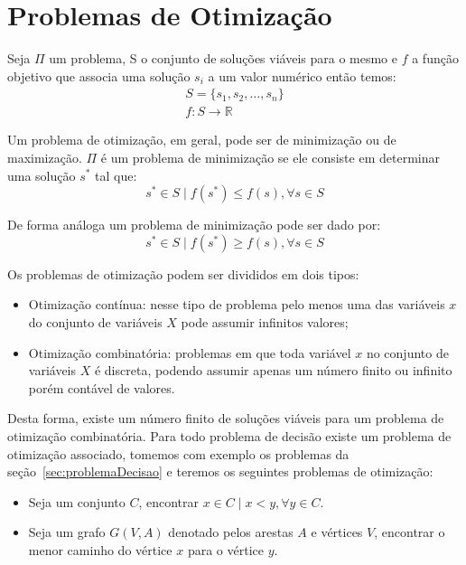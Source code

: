 \section{Problemas de Otimização} \label{sec:problemaOtimizacao}

Seja $\Pi$ um problema, S o conjunto de soluções viáveis para o mesmo e $f$ a função objetivo que associa uma solução $s_i$ a um valor numérico então temos:
\begin{equation}  \label{eq:problemaOtimizacao}
\begin{split}
S = \{s_1, s_2, \dots, s_n \} \\
f: S \rightarrow \mathbb{R}
\end{split}
\end{equation}

Um problema de otimização, em geral, pode ser de minimização ou de maximização.
$\Pi$ é um problema de minimização se ele consiste em determinar uma solução $s^*$ tal que:
\begin{equation}  \label{eq:problemaOtimizacaoMinimizar}
s^* \in S \mid f(s^*) \leq f(s), \forall s \in S
\end{equation}

De forma análoga um problema de minimização pode ser dado por:
\begin{equation}  \label{eq:problemaOtimizacaoMaximizar}
s^* \in S \mid f(s^*) \geq f(s), \forall s \in S
\end{equation}

Os problemas de otimização podem ser divididos em dois tipos:

\begin{itemize}
    \item Otimização contínua: nesse tipo de problema pelo menos uma das variáveis $x$ do conjunto de variáveis $X$ pode assumir infinitos valores;
    \item Otimização combinatória: problemas em que toda variável $x$ no conjunto de variáveis $X$ é discreta, podendo assumir apenas um número finito ou infinito porém contável de valores.
\end{itemize}

Desta forma, existe um número finito de soluções viáveis para um problema de otimização combinatória.
Para todo problema de decisão existe um problema de otimização associado, tomemos com exemplo os problemas da seção~\ref{sec:problemaDecisao} e teremos os seguintes problemas de otimização:

\begin{itemize}
    \item Seja um conjunto $C$, encontrar $x \in C \mid x < y, \forall y \in C$.
    \item Seja um grafo $G(V,A)$ denotado pelos arestas $A$ e vértices $V$, encontrar o menor caminho do vértice $x$ para o vértice $y$.
\end{itemize}

% 



